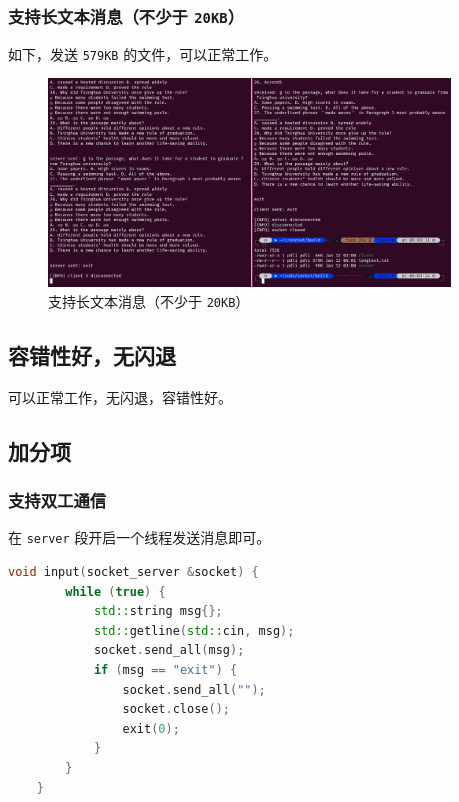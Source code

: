 \documentclass{article}
\begin{document}
\subsubsection{支持长文本消息（不少于 \texttt{20KB}）}

如下，发送 \texttt{579KB} 的文件，可以正常工作。

\begin{figure}[H]
    \centering
    \includegraphics[width=0.95\textwidth]{img/8.png}
    \caption{支持长文本消息（不少于 \texttt{20KB}）}
\end{figure}

\subsection{容错性好，无闪退}

可以正常工作，无闪退，容错性好。

\subsection{加分项}

\subsubsection{支持双工通信}

在 \texttt{server} 段开启一个线程发送消息即可。

\begin{lstlisting}[language=C++]
    void input(socket_server &socket) {
        while (true) {
            std::string msg{};
            std::getline(std::cin, msg);
            socket.send_all(msg);
            if (msg == "exit") {
                socket.send_all("");
                socket.close();
                exit(0);
            }
        }
    }    
\end{lstlisting}
\end{document}
